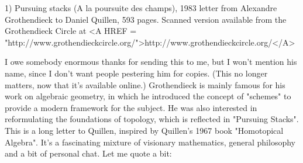 

1) Pursuing stacks (A la poursuite des champs), 1983 letter from Alexandre
Grothendieck to Daniel Quillen, 593 pages.  Scanned version available
from the Grothendieck Circle at <A HREF = "http://www.grothendieckcircle.org/">http://www.grothendieckcircle.org/</A>

I owe somebody enormous thanks for sending this to me, but I won't
mention his name, since I don't want people pestering him for copies.
(This no longer matters, now that it's available online.)
Grothendieck is mainly famous for his work on algebraic geometry, in
which he introduced the concept of "schemes" to provide a modern
framework for the subject.  He was also interested in reformulating the
foundations of topology, which is reflected in "Pursuing Stacks".  
This
is a long letter to Quillen, inspired by Quillen's 1967 book
"Homotopical Algebra".  It's a fascinating mixture of visionary
mathematics, general philosophy and a bit of personal chat.  Let me
quote a bit:



